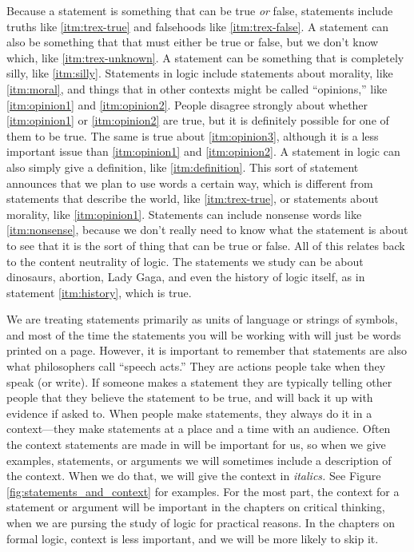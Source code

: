 Because a statement is something that can be true \emph{or} false, statements include truths like \ref{itm:trex-true} and falsehoods like \ref{itm:trex-false}.
A statement can also be something that that must either be true or false, but we don't know which, like \ref{itm:trex-unknown}.
A statement can be something that is completely silly, like \ref{itm:silly}.
Statements in logic include statements about morality, like \ref{itm:moral}, and things that in other contexts might be called ``opinions,'' like \ref{itm:opinion1} and \ref{itm:opinion2}.
People disagree strongly about whether \ref{itm:opinion1} or \ref{itm:opinion2} are true, but it is definitely possible for one of them to be true. The same is true about \ref{itm:opinion3}, although it is a less important issue than \ref{itm:opinion1} and \ref{itm:opinion2}.
A statement in logic can also simply give a definition, like \ref{itm:definition}.
This sort of statement announces that we plan to use words a certain way, which is different from statements that describe the world, like \ref{itm:trex-true}, or statements about morality, like \ref{itm:opinion1}.
Statements can include nonsense words like \ref{itm:nonsense}, because we don't really need to know what the statement is about to see that it is the sort of thing that can be true or false.
All of this relates back to the content neutrality of logic.
The statements we study can be about dinosaurs, abortion, Lady Gaga, and even the history of logic itself, as in statement \ref{itm:history}, which is true.

We are treating statements primarily as units of language or strings of symbols, and most of the time the statements you will be working with will just be words printed on a page. However, it is important to remember that statements are also what philosophers call ``speech acts.'' They are actions people take when they speak (or write). If someone makes a statement they are typically telling other people that they believe the statement to be true, and will back it up with evidence if asked to. When people make statements, they always do it in a context---they make statements at a place and a time with an audience. Often the context statements are made in will be important for us, so when we give examples, statements, or arguments we will sometimes include a description of the context. When we do that, we will give the context in \textit{italics.} See Figure \ref{fig:statements_and_context} for examples. \label{context_marker} For the most part, the context for a statement or argument will be important in the chapters on critical thinking, when we are pursing the study of logic for practical reasons. In the chapters on formal logic, context is less important, and we will be more likely to skip it.

